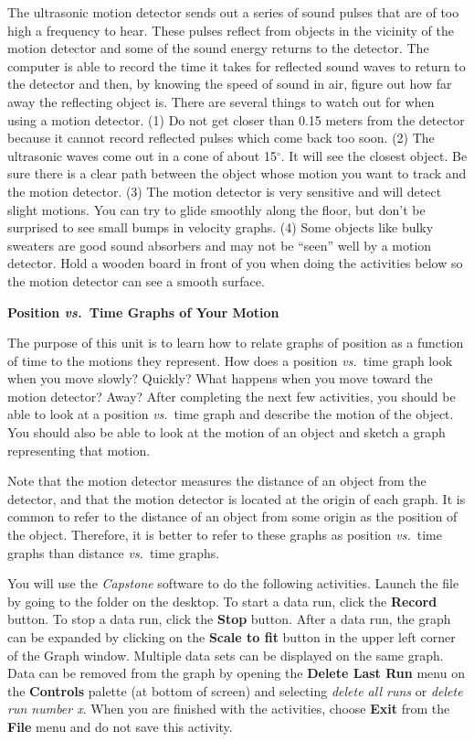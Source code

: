 The ultrasonic motion detector sends out a series of sound pulses that are of
too high a frequency to hear. These pulses reflect from objects in the vicinity
of the motion detector and some of the sound energy returns to the detector.
The computer is able to record the time it takes for reflected sound waves to
return to the detector and then, by knowing the speed of sound in air, figure
out how far away the reflecting object is. There are several things to watch
out for when using a motion detector. (1) Do not get closer than 0.15 meters
from the detector because it cannot record reflected pulses which come back
too soon. (2) The ultrasonic waves come out in a cone of about 15\( ^{\circ } \).
It will see the closest object. Be sure there is a clear path between the object
whose motion you want to track and the motion detector. (3) The motion detector
is very sensitive and will detect slight motions. You can try to glide smoothly
along the floor, but don't be surprised to see small bumps in velocity graphs.
(4) Some objects like bulky sweaters are good sound absorbers and may not be
``seen'' well by a motion detector. Hold a wooden board in front of you when 
doing the activities below so the motion detector can see a smooth surface.

\textbf{Position \textit{vs.}~Time Graphs of Your Motion }

The purpose of this unit is to learn how to relate graphs of position as a function
of time to the motions they represent. How does a position \textit{vs.}~time graph look
when you move slowly? Quickly? What happens when you move toward the motion
detector? Away? After completing the next few activities, you should be able
to look at a position \textit{vs.}~time graph and describe the motion of the object.
You should also be able to look at the motion of an object and sketch a graph
representing that motion.

Note that the motion detector measures the distance of an object from the detector,
and that the motion detector is located at the origin of each graph. It is common
to refer to the distance of an object from some origin as the position of the
object. Therefore, it is better to refer to these graphs as position \textit{vs.}~time
graphs than distance \textit{vs.}~time graphs.

You will use the \textit{Capstone} software to do the following activities.
Launch the  file by going to the \filename{\coursefolder} folder on the desktop. 
To start a data run, click the \textbf{Record} button. To stop a data run,
click the \textbf{Stop} button. After a data run, the graph can be expanded
by clicking on the \textbf{Scale to fit} button in the upper left corner of
the Graph window. Multiple data sets can be displayed on the same graph. Data
can be removed from the graph by opening the \textbf{Delete Last Run} menu on the \textbf{Controls} palette 
 (at bottom of screen) and selecting \textit{delete all runs} or \textit{delete run number x}.
  When you are finished with the activities, choose \textbf{Exit} from the \textbf{File} menu
and do not save this activity.

